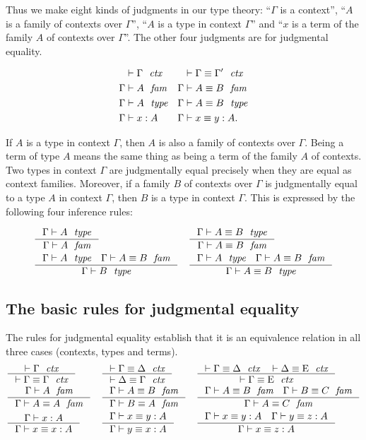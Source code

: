 Thus we make eight kinds of judgments in our type theory: ``$\Gamma$ is a context'',
``$A$ is a family of contexts over $\Gamma$'', ``$A$ is a type in context $\Gamma$''
and ``$x$ is a term of the family $A$ of contexts over $\Gamma$''. The other four
judgments are for judgmental equality. 

\begin{align*}
\jctx*{\Gamma} 
& \jctxeq*{\Gamma}{\Gamma'}
  \\
\jfam*{\Gamma}{A} 
& \jfameq*{\Gamma}{A}{B}
  \\
\jtype*{\Gamma}{A} 
& \jtypeeq*{\Gamma}{A}{B}
  \\
\jterm*{\Gamma}{A}{x} 
& \jtermeq*{\Gamma}{A}{x}{y}.
\end{align*}

If $A$ is a type
in context $\Gamma$, then $A$ is also a family of contexts over $\Gamma$. Being
a term of type $A$ means the same thing as being a term of the family $A$ of contexts.
Two types in context $\Gamma$ are judgmentally equal precisely when they are equal
as context families. Moreover, if a family $B$ of contexts over $\Gamma$ is
judgmentally equal to a type $A$ in context $\Gamma$, then $B$ is a type in
context $\Gamma$. This is expressed by the following four inference rules:

\begin{align*}
& \inference
  { \jtype{\Gamma}{A}
    }
  { \jfam{\Gamma}{A}
    }
& & \inference
    { \jtypeeq{\Gamma}{A}{B}
      }
    { \jfameq{\Gamma}{A}{B}
      }
    \\
& \inference
  { \jtype{\Gamma}{A}
    \jfameq{\Gamma}{A}{B}
    }
  { \jtype{\Gamma}{B}
    }
& & \inference
    { \jtype{\Gamma}{A}
      \jfameq{\Gamma}{A}{B}
      }
    { \jtypeeq{\Gamma}{A}{B}
      }
\end{align*}

\subsection{The basic rules for judgmental equality}
The rules for judgmental equality establish that it is an equivalence relation
in all three cases (contexts, types and terms).
\bgroup\small
\begin{align*}
& \inference
  { \jctx{\Gamma}
    }
  { \jctxeq{\Gamma}{\Gamma}
    } 
& & \inference
    { \jctxeq{\Gamma}{\Delta}
      }
    { \jctxeq{\Delta}{\Gamma}
      } 
& & \inference
    { \jctxeq{\Gamma}{\Delta}
      \jctxeq{\Delta}{\greek{E}}
      }
    { \jctxeq{\Gamma}{\greek{E}}
      }
    \\
& \inference
  { \jfam{\Gamma}{A}
    }
  { \jfameq{\Gamma}{A}{A}
    } 
& & \inference
    { \jfameq{\Gamma}{A}{B}
      }
    { \jfameq{\Gamma}{B}{A}
      }
& & \inference
    { \jfameq{\Gamma}{A}{B}
      \jfameq{\Gamma}{B}{C}
      }
    { \jfameq{\Gamma}{A}{C}
      }
    \\
& \inference
  { \jterm{\Gamma}{A}{x}
    }
  { \jtermeq{\Gamma}{A}{x}{x}
    }
& & \inference
    { \jtermeq{\Gamma}{A}{x}{y}
      }
    { \jtermeq{\Gamma}{A}{y}{x}
      }
& & \inference
    { \jtermeq{\Gamma}{A}{x}{y}
      \jtermeq{\Gamma}{A}{y}{z}
      }
    { \jtermeq{\Gamma}{A}{x}{z}
      }
\end{align*}
\egroup

